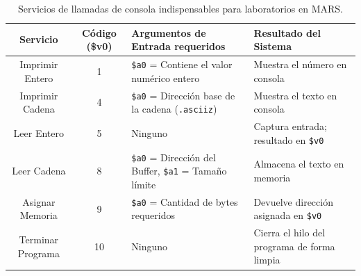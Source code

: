 \documentclass[11pt,letterpaper]{article}
\begin{document}
\begin{table}[h!]
\centering
\small
\begin{tabular}{ccll}
\toprule
\textbf{Servicio} & \textbf{Código (\$v0)} & \textbf{Argumentos de Entrada requeridos} & \textbf{Resultado del Sistema} \\
\midrule
Imprimir Entero & 1 & \texttt{\$a0} = Contiene el valor numérico entero & Muestra el número en consola \\
Imprimir Cadena & 4 & \texttt{\$a0} = Dirección base de la cadena (\texttt{.asciiz}) & Muestra el texto en consola \\
Leer Entero & 5 & Ninguno & Captura entrada; resultado en \texttt{\$v0} \\
Leer Cadena & 8 & \texttt{\$a0} = Dirección del Buffer, \texttt{\$a1} = Tamaño límite & Almacena el texto en memoria \\
Asignar Memoria & 9 & \texttt{\$a0} = Cantidad de bytes requeridos & Devuelve dirección asignada en \texttt{\$v0} \\
Terminar Programa & 10 & Ninguno & Cierra el hilo del programa de forma limpia \\
\bottomrule
\end{tabular}
\caption{Servicios de llamadas de consola indispensables para laboratorios en MARS.}
\end{table}
\end{document}
